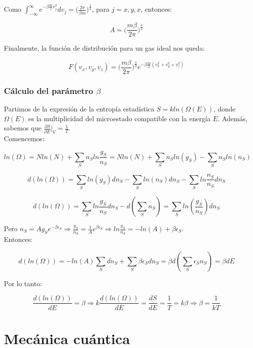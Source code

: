\documentclass[a4paper]{article}
\begin{document}
Como $\int_{-\infty}^{\infty}e^{-\beta \frac{m}{2}v_{j}^{2}}dv_{j} = \bigg(\frac{2\pi}{\beta m}\bigg)^{\frac{1}{2}}$, para $j = x, y, x$, entonces:

$$A = \bigg(\frac{m\beta}{2\pi}\bigg)^{\frac{3}{2}}$$

Finalmente, la funci\'on de distribuci\'on para un gas ideal nos queda:

\begin{equation}
\label{eq:boltzgasideal}
F(v_{x},v_{y},v_{z}) =  \bigg(\frac{m\beta}{2\pi}\bigg)^{\frac{3}{2}}e^{-\beta \frac{m}{2}(v_{x}^{2} + v_{y}^{2} + v_{z}^{2})}
\end{equation}

\subsubsection{C\'alculo del par\'ametro $\beta$}

Partimos de la expresi\'on de la entrop\'ia estad\'istica $S = k ln (\Omega(E))$, donde $\Omega(E)$ es la multiplicidad del microestado compatible con la energ\'ia $E$. Adem\'as, sabemos que $\frac{\partial S}{\partial E}|_{V} = \frac{1}{T}$.\\

Comencemos:

$$ln(\Omega) = N ln(N) + \sum_{S} n_{S} ln \frac{g_{S}}{n_{S}} = N ln(N) + \sum_{S} n_{S}ln(g_{S}) - \sum_{S} n_{S}ln(n_{S})$$

$$d(ln(\Omega)) = \sum_{S} ln(g_{S})dn_{S} - \sum_{S} ln(n_{S})dn_{S} - \sum_{S} ln \frac{n_{S}}{n_{S}}dn_{S}$$

$$d(ln(\Omega)) = \sum_{S} ln \frac{g_{S}}{n_{S}}dn_{S} - d(\sum_{S} n_{S}) = \sum_{S} ln (\frac{g_{S}}{n_{S}})dn_{S}$$

Pero $n_{S} = Ag_{S}e^{-\beta \epsilon_{S}} \Rightarrow \frac{g_{S}}{n_{S}} = \frac{1}{A}e^{\beta \epsilon_{S}} \Rightarrow ln \frac{g_{S}}{n_{S}} = -ln(A) + \beta \epsilon_{S}$.\\

Entonces:

$$d(ln(\Omega)) = -ln(A)\sum_{S} dn_{S} + \sum_{S} \beta \epsilon_{S}dn_{S} = \beta d (\sum_{S} \epsilon_{S}n_{S}) = \beta dE$$

Por lo tanto:

$$ \frac{d(ln(\Omega))}{dE} = \beta \Rightarrow k\frac{d(ln(\Omega))}{dE} = \frac{dS}{dE} = \frac{1}{T} = k\beta \Rightarrow \beta = \frac{1}{kT}$$

\newpage

\section{Mec\'anica cu\'antica}
\end{document}
